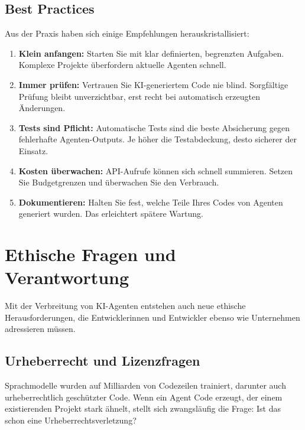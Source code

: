 \subsection{Best Practices}

Aus der Praxis haben sich einige Empfehlungen herauskristallisiert:

\begin{enumerate}
  \item \textbf{Klein anfangen:} Starten Sie mit klar definierten, begrenzten Aufgaben. Komplexe Projekte überfordern aktuelle Agenten schnell.
  
  \item \textbf{Immer prüfen:} Vertrauen Sie KI-generiertem Code nie blind. Sorgfältige Prüfung bleibt unverzichtbar, erst recht bei automatisch erzeugten Änderungen.
  
  \item \textbf{Tests sind Pflicht:} Automatische Tests sind die beste Absicherung gegen fehlerhafte Agenten-Outputs. Je höher die Testabdeckung, desto sicherer der Einsatz.
  
  \item \textbf{Kosten überwachen:} API-Aufrufe können sich schnell summieren. Setzen Sie Budgetgrenzen und überwachen Sie den Verbrauch.
  
  \item \textbf{Dokumentieren:} Halten Sie fest, welche Teile Ihres Codes von Agenten generiert wurden. Das erleichtert spätere Wartung.
\end{enumerate}


\section{Ethische Fragen und Verantwortung}

Mit der Verbreitung von KI-Agenten entstehen auch neue ethische Herausforderungen, die Entwicklerinnen und Entwickler ebenso wie Unternehmen adressieren müssen.

\subsection{Urheberrecht und Lizenzfragen}

Sprachmodelle wurden auf Milliarden von Codezeilen trainiert, darunter auch urheberrechtlich geschützter Code. Wenn ein Agent Code erzeugt, der einem existierenden Projekt stark ähnelt, stellt sich zwangsläufig die Frage: Ist das schon eine Urheberrechtsverletzung?

